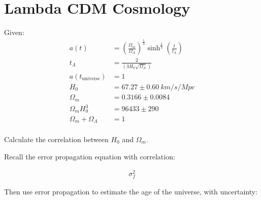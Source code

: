\section{Lambda CDM Cosmology}
Given:
\begin{align*}
    a(t) &= \left(\frac{\Omega_m}{\Omega_\Lambda}\right)^\frac{1}{3} \sinh^{\frac{2}{3}}\left(\frac{t}{t_\Lambda}\right) \\
    t_\Lambda &= \frac{2}{\left(3H_0\sqrt{\Omega_\Lambda}\right)} \\
    a(t_{\text{universe}}) &= 1 \\
    H_0 &= 67.27 \pm \SI{0.60}{km/s/Mpc} \\
    \Omega_m &= 0.3166 \pm 0.0084 \\
    \Omega_m H_0^3 &= 96433 \pm 290 \\
    \Omega_m + \Omega_\Lambda &= 1 \\
\end{align*}

Calculate the correlation between $H_0$ and $\Omega_m$.

Recall the error propagation equation with correlation:

\begin{align*}
    \sigma_f^2 
\end{align*}


Then use error propagation to estimate the age of the universe, with uncertainty:

